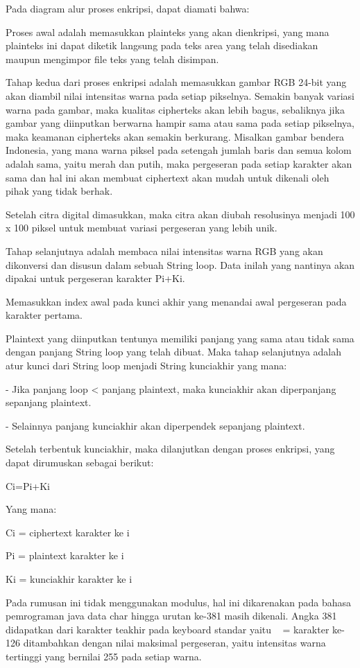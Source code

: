 \documentclass{jtetiproposalskripsi}
\begin{document}
Pada diagram alur proses enkripsi, dapat diamati bahwa:

Proses awal adalah memasukkan plainteks yang akan dienkripsi, yang mana plainteks ini dapat diketik langsung pada teks area yang telah disediakan maupun mengimpor file teks yang telah disimpan.

Tahap kedua dari proses enkripsi adalah memasukkan gambar RGB 24-bit yang akan diambil nilai intensitas warna pada setiap pikselnya. Semakin banyak variasi warna pada gambar, maka kualitas cipherteks akan lebih bagus, sebaliknya jika gambar yang diinputkan berwarna hampir sama atau sama pada setiap pikselnya, maka keamanan cipherteks akan semakin berkurang. Misalkan gambar bendera Indonesia, yang mana warna piksel pada setengah jumlah baris dan semua kolom adalah sama, yaitu merah dan putih, maka pergeseran pada setiap karakter akan sama dan hal ini akan membuat ciphertext akan mudah untuk dikenali oleh pihak yang tidak berhak.

Setelah citra digital dimasukkan, maka citra akan diubah resolusinya menjadi 100 x 100 piksel untuk membuat variasi pergeseran yang lebih unik.

Tahap selanjutnya adalah membaca nilai intensitas warna RGB yang akan dikonversi dan disusun dalam sebuah String loop. Data inilah yang nantinya akan dipakai untuk pergeseran karakter Pi+Ki.

Memasukkan index awal pada kunci akhir yang menandai awal pergeseran pada karakter pertama.

Plaintext yang diinputkan tentunya memiliki panjang yang sama atau tidak sama dengan panjang String loop yang telah dibuat. Maka tahap selanjutnya adalah atur kunci dari String loop menjadi String kunciakhir yang mana:

-	Jika panjang loop < panjang plaintext, maka kunciakhir akan diperpanjang sepanjang plaintext.

-	Selainnya panjang kunciakhir akan diperpendek sepanjang plaintext.

Setelah terbentuk kunciakhir, maka dilanjutkan dengan proses enkripsi, yang dapat dirumuskan sebagai berikut:

Ci=Pi+Ki
 
Yang mana:

Ci	= ciphertext karakter ke i

Pi	= plaintext karakter ke i

Ki	= kunciakhir karakter ke i

Pada rumusan ini tidak menggunakan modulus, hal ini dikarenakan pada bahasa pemrograman java data char hingga urutan ke-381 masih dikenali. Angka 381 didapatkan dari karakter teakhir pada keyboard standar yaitu ~ = karakter ke-126 ditambahkan dengan nilai maksimal pergeseran, yaitu intensitas warna tertinggi yang bernilai 255 pada setiap warna.
\end{document}
